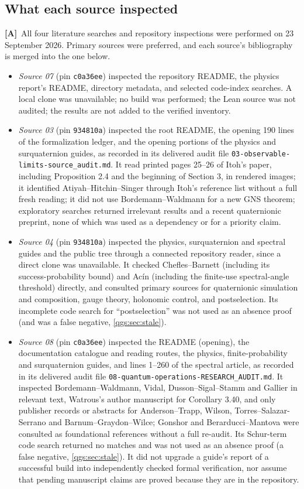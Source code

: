 \documentclass[11pt,oneside]{article}
\numberwithin{equation}{section}
\theoremstyle{plain}
\theoremstyle{definition}
\theoremstyle{remark}
\newcommand{\TA}{\textcolor{TierA}{\textsf{\bfseries[A]}}}
\begin{document}
\subsection{What each source inspected}
\TA\ All four literature searches and repository inspections were performed on 23 September 2026. Primary sources were preferred, and each source's bibliography is merged into the one below.
\begin{itemize}
\item \emph{Source 07} (pin \texttt{c0a36ee}) inspected the repository README, the physics report's README, directory metadata, and selected code-index searches. A local clone was unavailable; no build was performed; the Lean source was not audited; the results are not added to the verified inventory.
\item \emph{Source 03} (pin \texttt{934810a}) inspected the root README, the opening 190 lines of the formalization ledger, and the opening portions of the physics and surquaternion guides, as recorded in its delivered audit file \nolinkurl{03-observable-limits-source_audit.md}. It read printed pages 25--26 of Itoh's paper, including Proposition 2.4 and the beginning of Section 3, in rendered images; it identified Atiyah--Hitchin--Singer through Itoh's reference list without a full fresh reading; it did not use Bordemann--Waldmann for a new GNS theorem; exploratory searches returned irrelevant results and a recent quaternionic preprint, none of which was used as a dependency or for a priority claim.
\item \emph{Source 04} (pin \texttt{934810a}) inspected the physics, surquaternion and spectral guides and the public tree through a connected repository reader, since a direct clone was unavailable. It checked Chefles--Barnett (including its success-probability bound) and Ac\'in (including the finite-use spectral-angle threshold) directly, and consulted primary sources for quaternionic simulation and composition, gauge theory, holonomic control, and postselection. Its incomplete code search for ``postselection'' was not used as an absence proof (and was a false negative, \cref{qgs:sec:stale}).
\item \emph{Source 08} (pin \texttt{c0a36ee}) inspected the README (opening), the documentation catalogue and reading routes, the physics, finite-probability and surquaternion guides, and lines 1--260 of the spectral article, as recorded in its delivered audit file \nolinkurl{08-quantum-operations-RESEARCH_AUDIT.md}. It inspected Bordemann--Waldmann, Vidal, Dusson--Sigal--Stamm and Gallier in relevant text, Watrous's author manuscript for Corollary 3.40, and only publisher records or abstracts for Anderson--Trapp, Wilson, Torres--Salazar-Serrano and Barnum--Graydon--Wilce; Gonshor and Berarducci--Mantova were consulted as foundational references without a full re-audit. Its Schur-term code search returned no matches and was not used as an absence proof (a false negative, \cref{qgs:sec:stale}). It did not upgrade a guide's report of a successful build into independently checked formal verification, nor assume that pending manuscript claims are proved because they are in the repository.
\end{itemize}
\end{document}
